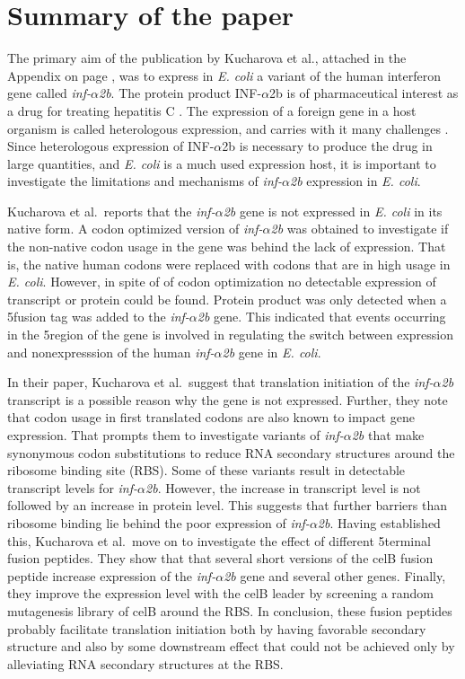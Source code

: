 %
\section{Summary of the paper}
The primary aim of the publication by Kucharova et al., attached in the
Appendix on page \pageref{vero_paper}, was to express in \textit{E. coli} a
variant of the human interferon gene called \textit{inf-$\alpha$2b}. The
protein product INF-$\alpha$2b is of pharmaceutical interest as a drug for
treating hepatitis C \cite{manns_peginterferon_2001}. The expression of a
foreign gene in a host organism is called heterologous expression, and carries
with it many challenges \cite{gustafsson_codon_2004}. Since heterologous
expression of INF-$\alpha$2b is necessary to produce the drug in large
quantities, and \textit{E. coli} is a much used expression host, it is
important to investigate the limitations and mechanisms of
\textit{inf-$\alpha$2b} expression in \textit{E. coli}.

Kucharova et al.\ reports that the \textit{inf-$\alpha$2b} gene is not
expressed in \textit{E. coli} in its native form. A codon optimized version of
\textit{inf-$\alpha$2b} was obtained to investigate if the non-native codon
usage in the gene was behind the lack of expression. That is, the native human
codons were replaced with codons that are in high usage in \textit{E. coli}.
However, in spite of of codon optimization no detectable expression of
transcript or protein could be found. Protein product was only detected when a
5\ppp fusion tag was added to the \textit{inf-$\alpha$2b} gene. This indicated
that events occurring in the 5\ppp region of the gene is involved in regulating
the switch between expression and nonexpresssion of the human \textit{inf-$\alpha$2b}
gene in \textit{E. coli}.

In their paper, Kucharova et al.\ suggest that translation initiation of the
\textit{inf-$\alpha$2b} transcript is a possible reason why the gene is not
expressed. Further, they note that codon usage in first translated codons are
also known to impact gene expression. That prompts them to investigate variants
of \textit{inf-$\alpha$2b} that make synonymous codon substitutions to reduce
RNA secondary structures around the ribosome binding site (RBS). Some of these
variants result in detectable transcript levels for \textit{inf-$\alpha$2b}.
However, the increase in transcript level is not followed by an increase in
protein level. This suggests that further barriers than ribosome binding lie
behind the poor expression of \textit{inf-$\alpha$2b}. Having established this,
Kucharova et al.\ move on to investigate the effect of different 5\ppp terminal
fusion peptides. They show that that several short versions of the celB fusion
peptide increase expression of the \textit{inf-$\alpha$2b} gene and several
other genes. Finally, they improve the expression level with the celB leader by
screening a random mutagenesis library of celB around the RBS. In conclusion,
these fusion peptides probably facilitate translation initiation both by having
favorable secondary structure and also by some downstream effect that could not
be achieved only by alleviating RNA secondary structures at the RBS.

